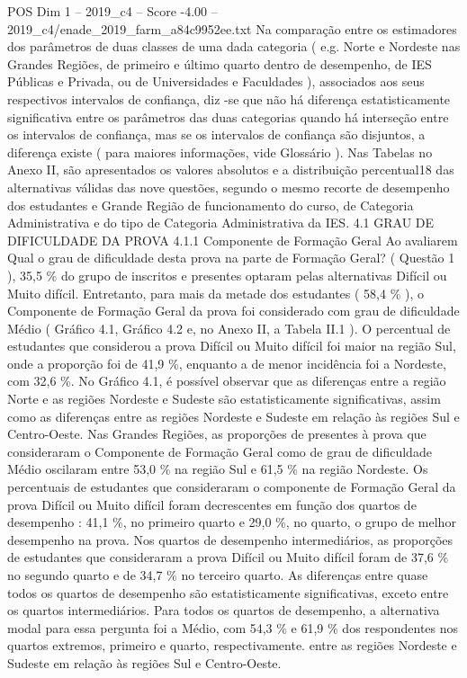 \begin{textsample}{POS Dim 1 – 2019\_c4 – Score -4.00 – 2019\_c4/enade\_2019\_farm\_a84c9952ee.txt}
Na comparação entre os estimadores dos parâmetros de duas classes de uma dada categoria ( e.g.
Norte e Nordeste nas Grandes Regiões, de primeiro e último quarto dentro de desempenho, de IES Públicas e Privada, ou de Universidades e Faculdades ), associados aos seus respectivos intervalos de confiança, diz -se que não há diferença estatisticamente significativa entre os parâmetros das duas categorias quando há interseção entre os intervalos de confiança, mas se os intervalos de confiança são disjuntos, a diferença existe ( para maiores informações, vide Glossário ).
Nas Tabelas no Anexo II, são apresentados os valores absolutos e a distribuição percentual18 das alternativas válidas das nove questões, segundo o mesmo recorte de desempenho dos estudantes e Grande Região de funcionamento do curso, de Categoria Administrativa e do tipo de Categoria Administrativa da IES. 4.1 GRAU DE DIFICULDADE DA PROVA 4.1.1 Componente de Formação Geral Ao avaliarem Qual o grau de dificuldade desta prova na parte de Formação Geral? ( Questão 1 ), 35,5 \% do grupo de inscritos e presentes optaram pelas alternativas Difícil ou Muito difícil.
Entretanto, para mais da metade dos estudantes ( 58,4 \% ), o Componente de Formação Geral da prova foi considerado com grau de dificuldade Médio ( Gráfico 4.1, Gráfico 4.2 e, no Anexo II, a Tabela II.1 ).
O percentual de estudantes que considerou a prova Difícil ou Muito difícil foi maior na região Sul, onde a proporção foi de 41,9 \%, enquanto a de menor incidência foi a Nordeste, com 32,6 \%.
No Gráfico 4.1, é possível observar que as diferenças entre a região Norte e as regiões Nordeste e Sudeste são estatisticamente significativas, assim como as diferenças entre as regiões Nordeste e Sudeste em relação às regiões Sul e Centro-Oeste.
Nas Grandes Regiões, as proporções de presentes à prova que consideraram o Componente de Formação Geral como de grau de dificuldade Médio oscilaram entre 53,0 \% na região Sul e 61,5 \% na região Nordeste.
Os percentuais de estudantes que consideraram o componente de Formação Geral da prova Difícil ou Muito difícil foram decrescentes em função dos quartos de desempenho : 41,1 \%, no primeiro quarto e 29,0 \%, no quarto, o grupo de melhor desempenho na prova.
Nos quartos de desempenho intermediários, as proporções de estudantes que consideraram a prova Difícil ou Muito difícil foram de 37,6 \% no segundo quarto e de 34,7 \% no terceiro quarto.
As diferenças entre quase todos os quartos de desempenho são estatisticamente significativas, exceto entre os quartos intermediários.
Para todos os quartos de desempenho, a alternativa modal para essa pergunta foi a Médio, com 54,3 \% e 61,9 \% dos respondentes nos quartos extremos, primeiro e quarto, respectivamente. entre as regiões Nordeste e Sudeste em relação às regiões Sul e Centro-Oeste.

\end{textsample}

